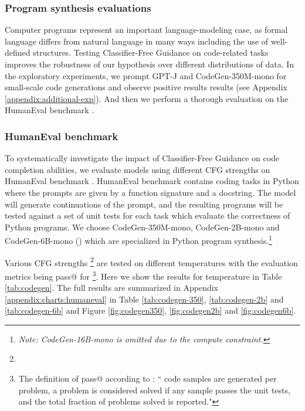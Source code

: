 \documentclass{article}
\begin{document}
\subsubsection{Program synthesis evaluations}\label{sct:experiments:text-to-text-generation:program_synthesis}
Computer programs represent an important language-modeling case, as formal language differs from natural language in many ways including the use of well-defined structures. Testing Classifier-Free Guidance on code-related tasks improves the robustness of our hypothesis over different distributions of data. In the exploratory experiments, we prompt GPT-J \cite{gpt-j} and CodeGen-350M-mono \cite{nijkamp2023codegen} for small-scale code generations and observe positive results results (see Appendix \ref{appendix:additional-exp}). And then we perform a thorough evaluation on the HumanEval benchmark \cite{chen2021codex}. 


\subsubsection{HumanEval benchmark}

To systematically investigate the impact of Classifier-Free Guidance on code completion abilities, we evaluate models using different CFG strengths on HumanEval benchmark \cite{chen2021codex}. HumanEval benchmark contains  coding tasks in Python where the prompts are given by a function signature and a docstring. The model will generate continuations of the prompt, and the resulting programs will be tested against a set of unit tests for each task which evaluate the correctness of Python programs. We choose CodeGen-350M-mono, CodeGen-2B-mono and CodeGen-6B-mono (\cite{nijkamp2023codegen}) which are specialized in Python program synthesis.\footnote{\textit{Note: CodeGen-16B-mono is omitted due to the compute constraint.}}

Various CFG strengths \footnote{} are tested on  different temperatures  with the evaluation metrics being pass@ for  \footnote{The definition of pass@ according to \cite{chen2021codex}: `` code samples are generated
per problem, a problem is considered solved if any sample passes the unit tests, and the total fraction of problems
solved is reported."}. Here we show the results for temperature in Table \ref{tab:codegen}. The full results are summarized in Appendix \ref{appendix:charts:humaneval} in Table \ref{tab:codegen-350}, \ref{tab:codegen-2b} and \ref{tab:codegen-6b} and Figure \ref{fig:codegen350}, \ref{fig:codegen2b} and \ref{fig:codegen6b}.
\end{document}
